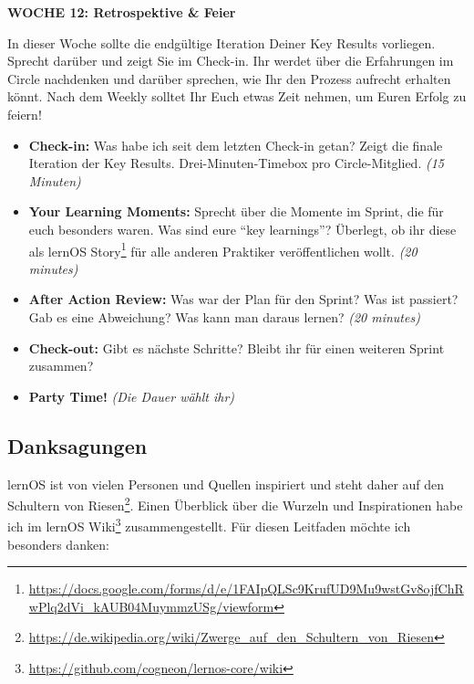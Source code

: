 \documentclass[
  ngerman,
  paper=a4,
,captions=tableheading
]{scrartcl}
\DeclareRobustCommand{\href}[2]{#2\footnote{\url{#1}}}
\providecommand{\tightlist}{%
  \setlength{\itemsep}{0pt}\setlength{\parskip}{0pt}}
\begin{document}
\textbf{WOCHE 12: Retrospektive \& Feier}

In dieser Woche sollte die endgültige Iteration Deiner Key Results
vorliegen. Sprecht darüber und zeigt Sie im Check-in. Ihr werdet über
die Erfahrungen im Circle nachdenken und darüber sprechen, wie Ihr den
Prozess aufrecht erhalten könnt. Nach dem Weekly solltet Ihr Euch etwas
Zeit nehmen, um Euren Erfolg zu feiern!

\begin{itemize}
\tightlist
\item
  \textbf{Check-in:} Was habe ich seit dem letzten Check-in getan? Zeigt
  die finale Iteration der Key Results. Drei-Minuten-Timebox pro
  Circle-Mitglied. \emph{(15 Minuten)}
\item
  \textbf{Your Learning Moments:} Sprecht über die Momente im Sprint,
  die für euch besonders waren. Was sind eure ``key learnings''?
  Überlegt, ob ihr diese als
  \href{https://docs.google.com/forms/d/e/1FAIpQLSc9KrufUD9Mu9wstGv8ojfChRwPlq2dVi_kAUB04MuymmzUSg/viewform}{lernOS
  Story} für alle anderen Praktiker veröffentlichen wollt. \emph{(20
  minutes)}
\item
  \textbf{After Action Review:} Was war der Plan für den Sprint? Was ist
  passiert? Gab es eine Abweichung? Was kann man daraus lernen?
  \emph{(20 minutes)}
\item
  \textbf{Check-out:} Gibt es nächste Schritte? Bleibt ihr für einen
  weiteren Sprint zusammen?
\item
  \textbf{Party Time!} \emph{(Die Dauer wählt ihr)}
\end{itemize}

\hypertarget{danksagungen}{%
\subsection{Danksagungen}\label{danksagungen}}

lernOS ist von vielen Personen und Quellen inspiriert und steht daher
\href{https://de.wikipedia.org/wiki/Zwerge_auf_den_Schultern_von_Riesen}{auf
den Schultern von Riesen}. Einen Überblick über die Wurzeln und
Inspirationen habe ich
\href{https://github.com/cogneon/lernos-core/wiki}{im lernOS Wiki}
zusammengestellt. Für diesen Leitfaden möchte ich besonders danken:
\end{document}
